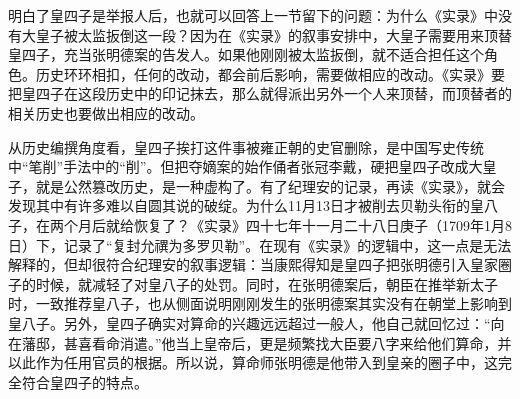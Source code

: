 
明白了皇四子是举报人后，也就可以回答上一节留下的问题：为什么《实录》中没有大皇子被太监扳倒这一段？因为在《实录》的叙事安排中，大皇子需要用来顶替皇四子，充当张明德案的告发人。如果他刚刚被太监扳倒，就不适合担任这个角色。历史环环相扣，任何的改动，都会前后影响，需要做相应的改动。《实录》要把皇四子在这段历史中的印记抹去，那么就得派出另外一个人来顶替，而顶替者的相关历史也要做出相应的改动。



从历史编撰角度看，皇四子挨打这件事被雍正朝的史官删除，是中国写史传统中“笔削”手法中的“削”。但把夺嫡案的始作俑者张冠李戴，硬把皇四子改成大皇子，就是公然篡改历史，是一种虚构了。有了纪理安的记录，再读《实录》，就会发现其中有许多难以自圆其说的破绽。为什么11月13日才被削去贝勒头衔的皇八子，在两个月后就给恢复了？《实录》四十七年十一月二十八日庚子（1709年1月8日）下，记录了“复封允禩为多罗贝勒”。在现有《实录》的逻辑中，这一点是无法解释的，但却很符合纪理安的叙事逻辑：当康熙得知是皇四子把张明德引入皇家圈子的时候，就减轻了对皇八子的处罚。同时，在张明德案后，朝臣在推举新太子时，一致推荐皇八子，也从侧面说明刚刚发生的张明德案其实没有在朝堂上影响到皇八子。另外，皇四子确实对算命的兴趣远远超过一般人，他自己就回忆过：“向在藩邸，甚喜看命消遣。”他当上皇帝后，更是频繁找大臣要八字来给他们算命，并以此作为任用官员的根据。所以说，算命师张明德是他带入到皇亲的圈子中，这完全符合皇四子的特点。


